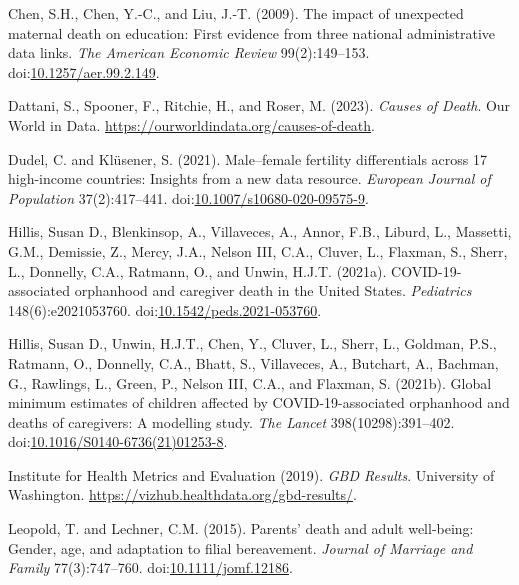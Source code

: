 \documentclass[
  11pt,
  letterpaper,
]{article}
\newlength{\cslhangindent}
\newlength{\cslentryspacingunit} %
\newenvironment{CSLReferences}[2] %
 {%
  \setlength{\parindent}{0pt}
  \ifodd #1
  \let\oldpar\par
  \def\par{\hangindent=\cslhangindent\oldpar}
  \fi
  \setlength{\parskip}{#2\cslentryspacingunit}
 }%
 {}
\begin{document}
\begin{CSLReferences}{1}{0}
\leavevmode{}%
Chen, S.H., Chen, Y.-C., and Liu, J.-T. (2009). The impact of unexpected maternal death on education: First evidence from three national administrative data links. \emph{The American Economic Review} 99(2):149--153. doi:\href{https://doi.org/10.1257/aer.99.2.149}{10.1257/aer.99.2.149}.

\leavevmode{}%
Dattani, S., Spooner, F., Ritchie, H., and Roser, M. (2023). \emph{Causes of Death}. Our World in Data. \url{https://ourworldindata.org/causes-of-death}.

\leavevmode{}%
Dudel, C. and Klüsener, S. (2021). Male--female fertility differentials across 17 high-income countries: Insights from a new data resource. \emph{European Journal of Population} 37(2):417--441. doi:\href{https://doi.org/10.1007/s10680-020-09575-9}{10.1007/s10680-020-09575-9}.

\leavevmode{}%
Hillis, Susan D., Blenkinsop, A., Villaveces, A., Annor, F.B., Liburd, L., Massetti, G.M., Demissie, Z., Mercy, J.A., Nelson III, C.A., Cluver, L., Flaxman, S., Sherr, L., Donnelly, C.A., Ratmann, O., and Unwin, H.J.T. (2021a). COVID-19-associated orphanhood and caregiver death in the {U}nited {S}tates. \emph{Pediatrics} 148(6):e2021053760. doi:\href{https://doi.org/10.1542/peds.2021-053760}{10.1542/peds.2021-053760}.

\leavevmode{}%
Hillis, Susan D., Unwin, H.J.T., Chen, Y., Cluver, L., Sherr, L., Goldman, P.S., Ratmann, O., Donnelly, C.A., Bhatt, S., Villaveces, A., Butchart, A., Bachman, G., Rawlings, L., Green, P., Nelson III, C.A., and Flaxman, S. (2021b). Global minimum estimates of children affected by COVID-19-associated orphanhood and deaths of caregivers: A modelling study. \emph{The Lancet} 398(10298):391--402. doi:\href{https://doi.org/10.1016/S0140-6736(21)01253-8}{10.1016/S0140-6736(21)01253-8}.

\leavevmode{}%
Institute for Health Metrics and Evaluation (2019). \emph{GBD Results}. University of Washington. \url{https://vizhub.healthdata.org/gbd-results/}.

\leavevmode{}%
Leopold, T. and Lechner, C.M. (2015). Parents' death and adult well-being: Gender, age, and adaptation to filial bereavement. \emph{Journal of Marriage and Family} 77(3):747--760. doi:\href{https://doi.org/10.1111/jomf.12186}{10.1111/jomf.12186}.


\end{CSLReferences}
\end{document}
